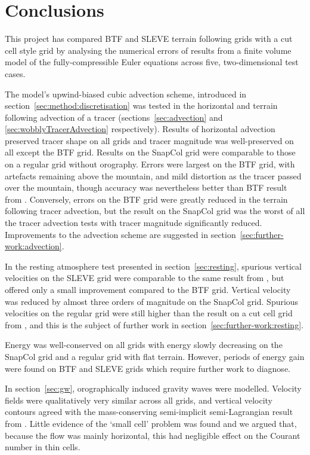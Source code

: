 \chapter{Conclusions}
This project has compared BTF and SLEVE terrain following grids with a cut cell style grid by analysing the numerical errors of results from a finite volume model of the fully-compressible Euler equations across five, two-dimensional test cases.

The model's upwind-biased cubic advection scheme, introduced in section~\ref{sec:method:discretisation} was tested in the horizontal and terrain following advection of a tracer (sections~\ref{sec:advection} and \ref{sec:wobblyTracerAdvection} respectively).  Results of horizontal advection preserved tracer shape on all grids and tracer magnitude was well-preserved on all except the BTF grid.  Results on the SnapCol grid were comparable to those on a regular grid without orography.  Errors were largest on the BTF grid, with artefacts remaining above the mountain, and mild distortion as the tracer passed over the mountain, though accuracy was nevertheless better than BTF result from \textcite{schaer2002}.  Conversely, errors on the BTF grid were greatly reduced in the terrain following tracer advection, but the result on the SnapCol grid was the worst of all the tracer advection tests with tracer magnitude significantly reduced.  Improvements to the advection scheme are suggested in section~\ref{sec:further-work:advection}.

In the resting atmosphere test presented in section~\ref{sec:resting}, spurious vertical velocities on the SLEVE grid were comparable to the same result from \textcite{schaer2002}, but offered only a small improvement compared to the BTF grid.  Vertical velocity was reduced by almost three orders of magnitude on the SnapCol grid.  Spurious velocities on the regular grid were still higher than the result on a cut cell grid from \textcite{good2013}, and this is the subject of further work in section~\ref{sec:further-work:resting}.

Energy was well-conserved on all grids with energy slowly decreasing on the SnapCol grid and a regular grid with flat terrain.  However, periods of energy gain were found on BTF and SLEVE grids which require further work to diagnose.

In section~\ref{sec:gw}, orographically induced gravity waves were modelled.  Velocity fields were qualitatively very similar across all grids, and vertical velocity contours agreed with the mass-conserving semi-implicit semi-Lagrangian result from \textcite{melvin2010}.  Little evidence of the `small cell' problem was found and we argued that, because the flow was mainly horizontal, this had negligible effect on the Courant number in thin cells.

